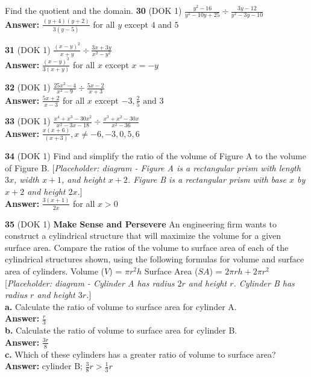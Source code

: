 \documentclass{article}
\newenvironment{practice}[2]{\textbf{#1} (DOK #2)}{}
\newcommand{\answer}[1]{\textbf{Answer:} #1}
\newcommand{\placeholder}[2]{[\textit{Placeholder: #1 - #2}]}
\begin{document}
Find the quotient and the domain.
\begin{practice}{30}{1}
$\frac{y^2 - 16}{y^2 - 10y + 25} \div \frac{3y - 12}{y^2 - 3y - 10}$ \\
\answer{$\frac{(y+4)(y+2)}{3(y-5)}$ for all $y$ except $4$ and $5$}
\end{practice}

\begin{practice}{31}{1}
$\frac{(x - y)^2}{x + y} \div \frac{3x + 3y}{x^2 - y^2}$ \\
\answer{$\frac{(x-y)^3}{3(x+y)}$ for all $x$ except $x = -y$}
\end{practice}

\begin{practice}{32}{1}
$\frac{25x^2 - 4}{x^2 - 9} \div \frac{5x - 2}{x + 3}$ \\
\answer{$\frac{5x+2}{x-3}$ for all $x$ except $-3, \frac{2}{5} \text{ and } 3$}
\end{practice}

\begin{practice}{33}{1}
$\frac{x^4 + x^3 - 30x^2}{x^2 - 3x - 18} \div \frac{x^3 + x^2 - 30x}{x^2 - 36}$ \\
\answer{$\frac{x(x+6)}{(x+3)}, x \neq -6, -3, 0, 5, 6$}
\end{practice}

\begin{practice}{34}{1}
Find and simplify the ratio of the volume of Figure A to the volume of Figure B.
\placeholder{diagram}{Figure A is a rectangular prism with length $3x$, width $x+1$, and height $x+2$. Figure B is a rectangular prism with base $x$ by $x+2$ and height $2x$.} \\
\answer{$\frac{3(x+1)}{2x}$ for all $x > 0$}
\end{practice}

\begin{practice}{35}{1}
\textbf{Make Sense and Persevere} An engineering firm wants to construct a cylindrical structure that will maximize the volume for a given surface area. Compare the ratios of the volume to surface area of each of the cylindrical structures shown, using the following formulas for volume and surface area of cylinders.
Volume ($V$) = $\pi r^2h$
Surface Area ($SA$) = $2\pi rh + 2\pi r^2$
\placeholder{diagram}{Cylinder A has radius $2r$ and height $r$. Cylinder B has radius $r$ and height $3r$.} \\
\textbf{a.} Calculate the ratio of volume to surface area for cylinder A. \\
\answer{$\frac{r}{3}$} \\
\textbf{b.} Calculate the ratio of volume to surface area for cylinder B. \\
\answer{$\frac{3r}{8}$} \\
\textbf{c.} Which of these cylinders has a greater ratio of volume to surface area? \\
\answer{cylinder B; $\frac{3}{8}r > \frac{1}{3}r$}
\end{practice}
\end{document}
